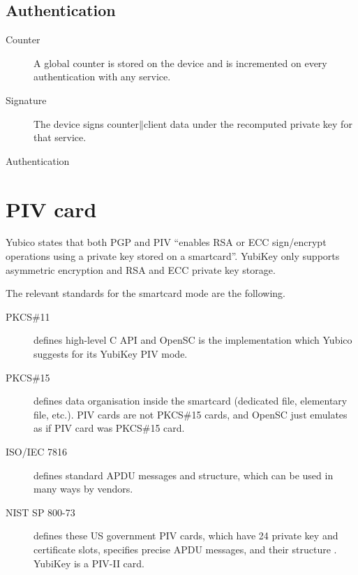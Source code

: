 \documentclass[a4paper]{article}
\newcommand{\conc}{\mathbin{\|}}
\begin{document}
\subsection{Authentication}

\begin{description}
	\item[Counter] A global counter is stored on the device and is incremented on every authentication with any service.
	\item[Signature] The device signs counter$\conc$client data under the recomputed private key for that service.
\end{description}

\begin{msc}{Authentication}
\nextlevel
{}
\nextlevel
{}
\nextlevel[2]
\nextlevel[2]
\action*{Sign counter$\conc$client data}{d}
\nextlevel[2]
\nextlevel
{}
\nextlevel
{}
\nextlevel[2]
\end{msc}


\section{PIV card}

Yubico states that both PGP and PIV ``enables RSA or ECC sign/encrypt operations using a private key stored on a smartcard''. YubiKey only supports asymmetric encryption and RSA and ECC private key storage.

The relevant standards for the smartcard mode are the following.
\begin{description}
	\item[PKCS\#11] defines high-level C API \citep{pkcs11} and OpenSC is the implementation which Yubico suggests for its YubiKey PIV mode.
	\item[PKCS\#15] defines data organisation inside the smartcard (dedicated file, elementary file, etc.). PIV cards are not PKCS\#15 cards, and OpenSC just emulates as if PIV card was PKCS\#15 card.
	\item[ISO/IEC 7816] defines standard APDU messages and structure, which can be used in many ways by vendors.
	\item[NIST SP 800-73] defines these US government PIV cards, which have 24 private key and certificate slots, specifies precise APDU messages, and their structure \citep{cooper2015interfaces}. YubiKey is a PIV-II card.
\end{description}
\end{document}
